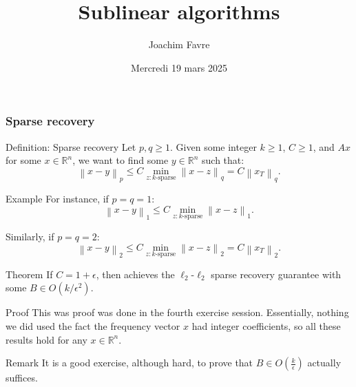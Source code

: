 \documentclass[a4paper]{article}
\title{Sublinear algorithms}
\author{Joachim Favre}
\date{Mercredi 19 mars 2025}
\begin{document}
\maketitle


\subsubsection{Sparse recovery}

\begin{parag}{Definition: Sparse recovery}
    Let $p, q \geq 1$. Given some integer $k \geq 1$, $C \geq 1$, and $A x$ for some $x \in \mathbb{R}^n$, we want to find some $y \in \mathbb{R}^n$ such that: 
    \[\left\|x -y\right\|_p \leq C \min_{z: \text{$k$-sparse}} \left\|x - z\right\|_q = C \left\|x_T\right\|_q.\]

    \begin{subparag}{Example}
        For instance, if $p = q = 1$: 
        \[\left\|x - y\right\|_1 \leq C\min_{z: \text{$k$-sparse}} \left\|x - z\right\|_1.\]

        Similarly, if $p = q = 2$:
        \[\left\|x - y\right\|_2 \leq C\min_{z: \text{$k$-sparse}} \left\|x - z\right\|_2 = C \left\|x_T\right\|_2.\]
    \end{subparag}
\end{parag}

\begin{parag}{Theorem}
    If $C = 1 + \epsilon$, then  achieves the $\ell_2$-$\ell_2$ sparse recovery guarantee with some $B \in O\left(k/\epsilon^2\right)$.

    \begin{subparag}{Proof}
        This was proof was done in the fourth exercise session. Essentially, nothing we did used the fact the frequency vector $x$ had integer coefficients, so all these results hold for any $x \in \mathbb{R}^n$.
    \end{subparag}

    \begin{subparag}{Remark}
        It is a good exercise, although hard, to prove that $B \in O\left(\frac{k}{\epsilon}\right)$ actually suffices.
    \end{subparag}
\end{parag}
\end{document}

